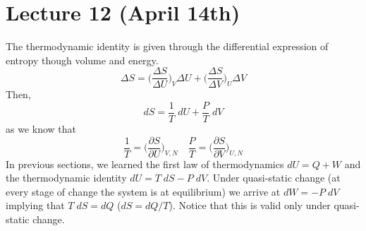\section{Lecture 12 (April 14th)}
\begin{thm}
The thermodynamic identity is given through the differential expression of entropy though volume and energy.
\[\Delta S=\Big(\dfrac{\Delta S}{\Delta U}\Big)_{V}\Delta U+\Big(\dfrac{\Delta S}{\Delta V}\Big)_{U}\Delta V\]
Then,
\[dS=\dfrac{1}{T}\;dU+\dfrac{P}{T}\;dV\]
as we know that
\[\dfrac{1}{T}=\Big(\dfrac{\partial S}{\partial U}\Big)_{V,N}\quad \dfrac{P}{T}=\Big(\dfrac{\partial S}{\partial V} \Big)_{U,N}\]
In previous sections, we learned the first law of thermodynamics $dU=Q+W$ and the thermodynamic identity $dU=T\;dS-P\;dV$. Under quasi-static change (at every stage of change the system is at equilibrium) we arrive at $dW=-P\;dV$ implying that $T\;dS=dQ$ ($dS=dQ/T$). Notice that this is valid only under quasi-static change.
\end{thm}
\vspace{2ex}

